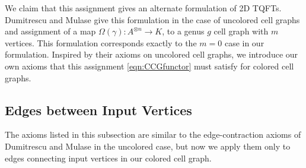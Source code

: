 \documentclass{amsart}
\newcommand{\tensor}{\otimes}
\newcommand{\Atn}{A^{\tensor n}}
\theoremstyle{definition}
\begin{document}
 
  We claim that this assignment gives an alternate formulation of 2D TQFTs. Dumitrescu and Mulase \cite{DM_ribbon} give this formulation in the case of uncolored cell graphs and assignment of a map $\Omega(\gamma):\Atn\longrightarrow K$, to a genus $g$ cell graph with $m$ vertices. This formulation corresponds exactly to the $m=0$ case in our formulation. Inspired by their axioms on uncolored cell graphs, we introduce our own axioms that this assignment \ref{eqn:CCGfunctor} must satisfy for colored cell graphs.

\subsection{Edges between Input Vertices}\label{SecRedAxioms}
 The axioms listed in this subsection are similar to the edge-contraction axioms of Dumitrescu and Mulase \cite{DM_ribbon} in the uncolored case, but now we apply them only to edges connecting input vertices in our colored cell graph.
\end{document}
